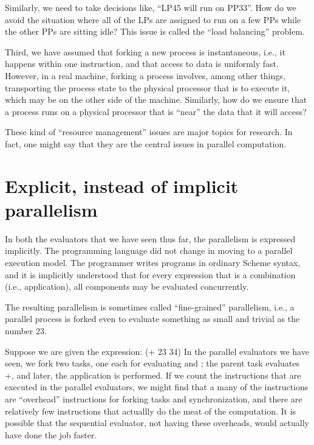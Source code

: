 Similarly, we need to take decisions like, ``LP45 will run on PP33''.
How do we avoid the situation where all of the LPs are assigned to run
on a few PPs while the other PPs are sitting idle?  This issue is
called the ``load balancing'' problem.

Third, we have assumed that forking a new process is instantaneous,
i.e., it happens within one instruction, and that access to data is
uniformly fast.  However, in a real machine, forking a process
involves, among other things, transporting the process state to the
physical processor that is to execute it, which may be on the other
side of the machine.  Similarly, how do we ensure that a process runs
on a physical processor that is ``near'' the data that it will access?

These kind of ``resource management'' issues are major topics for research.
In fact, one might say that they are the central issues in parallel
computation.


\newpage

\tableofcontents




\section{Explicit, instead of implicit parallelism}

In both the evaluators that we have seen thus far, the parallelism is
expressed implicitly.  The programming language did not change in
moving to a parallel execution model.  The programmer writes programs
in ordinary Scheme syntax, and it is implicitly understood that for
every expression that is a combination (i.e., application), all
components may be evaluated concurrently.

The resulting parallelism is sometimes called ``fine-grained'' parallelism,
i.e., a parallel process is forked even to evaluate something as small and
trivial as the number 23.

Suppose we are given the expression:
\beginlisp
(+ 23 34)
\endlisp
 In the parallel evaluators we have seen, we fork two tasks, one each for
evaluating {} and {}; the parent task evaluates {\cf +}, and
later, the application is performed.   If we count the instructions that are
executed in the parallel evaluators, we might find that a many of the
instructions are ``overhead'' instructions for forking tasks and
synchronization, and there are relatively few instructions that actuallly do
the meat of the computation.  It is possible that the sequential evaluator,
not having these overheads, would actually have done the job faster.

